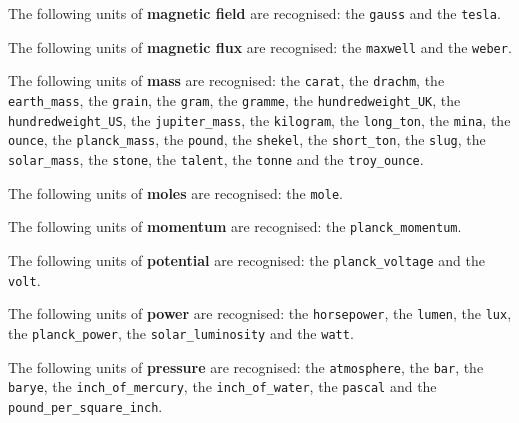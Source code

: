 \noindent The following units of {\bf magnetic field} are recognised:\newline
\noindent the {\tt gauss} and the {\tt tesla}.\vspace{5mm}

\noindent The following units of {\bf magnetic flux} are recognised:\newline
\noindent the {\tt maxwell} and the {\tt weber}.\vspace{5mm}

\noindent The following units of {\bf mass} are recognised:\newline
\noindent the {\tt carat}, the {\tt drachm}, the {\tt earth\_\-mass}, the {\tt grain}, the {\tt gram}, the {\tt gramme}, the {\tt hundredweight\_\-UK}, the {\tt hundredweight\_\-US}, the {\tt jupiter\_\-mass}, the {\tt kilogram}, the {\tt long\_\-ton}, the {\tt mina}, the {\tt ounce}, the {\tt planck\_\-mass}, the {\tt pound}, the {\tt shekel}, the {\tt short\_\-ton}, the {\tt slug}, the {\tt solar\_\-mass}, the {\tt stone}, the {\tt talent}, the {\tt tonne} and the {\tt troy\_\-ounce}.\vspace{5mm}

\noindent The following units of {\bf moles} are recognised:\newline
\noindent the {\tt mole}.\vspace{5mm}

\noindent The following units of {\bf momentum} are recognised:\newline
\noindent the {\tt planck\_\-momentum}.\vspace{5mm}

\noindent The following units of {\bf potential} are recognised:\newline
\noindent the {\tt planck\_\-voltage} and the {\tt volt}.\vspace{5mm}

\noindent The following units of {\bf power} are recognised:\newline
\noindent the {\tt horsepower}, the {\tt lumen}, the {\tt lux}, the {\tt planck\_\-power}, the {\tt solar\_\-luminosity} and the {\tt watt}.\vspace{5mm}

\noindent The following units of {\bf pressure} are recognised:\newline
\noindent the {\tt atmosphere}, the {\tt bar}, the {\tt barye}, the {\tt inch\_\-of\_\-mercury}, the {\tt inch\_\-of\_\-water}, the {\tt pascal} and the {\tt pound\_\-per\_\-square\_\-inch}.\vspace{5mm}

